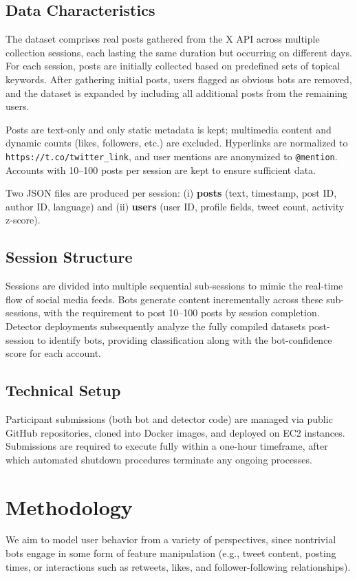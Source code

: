 \documentclass[conference]{IEEEtran}
\begin{document}
\subsection{Data Characteristics}
The dataset comprises real posts gathered from the X API across multiple collection sessions, 
each lasting the same duration but occurring on different days. For each session, posts are 
initially collected based on predefined sets of topical keywords. 
After gathering initial posts, users flagged as obvious bots are removed, and the dataset is 
expanded by including all additional posts from the remaining users. 

Posts are text-only and only static metadata is kept; 
multimedia content and dynamic counts (likes, followers, etc.) are excluded. Hyperlinks are normalized to \texttt{https://t.co/twitter\_link}, and user mentions are anonymized to \texttt{@mention}. Accounts with 10–100 posts per session are kept to ensure sufficient data.

Two JSON files are produced per session: (i) \textbf{posts} (text, timestamp, post ID, author ID, language) and (ii) \textbf{users} (user ID, profile fields, tweet count, activity z‑score).

\subsection{Session Structure}
Sessions are divided into multiple sequential sub-sessions 
to mimic the real-time flow of social media feeds. 
Bots generate content incrementally across 
these sub-sessions, with the requirement to post 10–100 posts by session completion. Detector deployments 
subsequently analyze the fully compiled datasets post-session 
to identify bots, providing classification along with the bot-confidence score for each account.

\subsection{Technical Setup}
Participant submissions (both bot and detector code) are managed via 
public GitHub repositories, cloned into Docker images, and deployed on EC2 instances. 
Submissions are required to execute 
fully within a one-hour timeframe, after which automated shutdown procedures terminate any ongoing processes.

\section{Methodology}
We aim to model user behavior
from a variety of perspectives, 
since nontrivial bots engage in some form 
of feature manipulation (e.g., tweet content, 
posting times, or interactions such as retweets, 
likes, and follower-following relationships).
\end{document}
